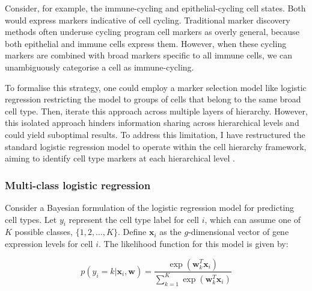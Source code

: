 Consider, for example, the immune-cycling and epithelial-cycling cell states. Both would express markers indicative of cell cycling. Traditional marker discovery methods often underuse cycling program cell markers as overly general, because both epithelial and immune cells express them. However, when these cycling markers are combined with broad markers specific to all immune cells, we can unambiguously categorise a cell as immune-cycling.

To formalise this strategy, one could employ a marker selection model like logistic regression restricting the model to groups of cells that belong to the same broad cell type. Then, iterate this approach across multiple layers of hierarchy. However, this isolated approach hinders information sharing across hierarchical levels and could yield suboptimal results. To address this limitation, I have restructured the standard logistic regression model to operate within the cell hierarchy framework, aiming to identify cell type markers at each hierarchical level .


\subsubsection*{Multi-class logistic regression}

Consider a Bayesian formulation of the logistic regression model for predicting cell types. Let $y_i$ represent the cell type label for cell $i$, which can assume one of $K$ possible classes, $\{1, 2, \ldots, K\}$. Define $\mathbf{x}_i$ as the $g$-dimensional vector of gene expression levels for cell $i$. The likelihood function for this model is given by:

\begin{equation}
    \label{eq:logistic-regression-likelihood}
    p(y_i = k | \mathbf{x}_i, \mathbf{w}) = \frac{\exp(\mathbf{w}_{k}^T \mathbf{x}_i)}{\sum_{k=1}^{K} \exp(\mathbf{w}_{k}^T \mathbf{x}_i)}
\end{equation}

